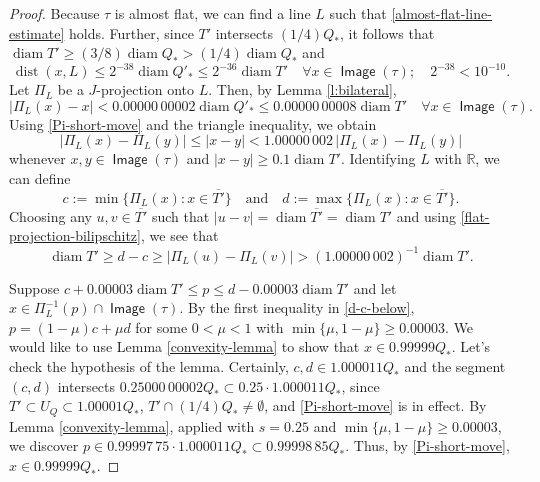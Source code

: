 \documentclass[12pt]{amsart}
\numberwithin{equation}{section}
\theoremstyle{plain}
\theoremstyle{definition}
\def\RR{\mathbb{R}}
\newcommand{\diam}{\mathop\mathrm{diam}\nolimits}
\newcommand{\dist}{\mathop\mathrm{dist}\nolimits}
\newcommand{\Image}{\mathop\mathsf{Image}\nolimits}
\numberwithin{figure}{section}
\begin{document}
\begin{proof} Because $\tau$ is almost flat, we can find a line $L$ such that \eqref{almost-flat-line-estimate} holds. Further, since $T'$ intersects $(1/4)Q_*$, it follows that $\diam T'\geq (3/8)\diam Q_*>(1/4)\diam Q_*$ and \begin{equation}
\label{central-almost-flat-line-estimate} \dist(x,L)\leq 2^{-38}\diam Q'_*\leq 2^{-36}\diam T'\quad\forall x\in \Image(\tau);\quad 2^{-38}< 10^{-10}.\end{equation} Let $\Pi_L$ be a $J$-projection onto $L$. Then, by Lemma \ref{l:bilateral}, \begin{equation}\label{Pi-short-move} |\Pi_L(x)-x|< 0.00000\,00002\diam Q'_*\leq 0.00000\,00008\diam T'\quad\forall x\in\Image(\tau).\end{equation} Using \eqref{Pi-short-move} and the triangle inequality, we obtain \begin{equation}\label{flat-projection-bilipschitz} |\Pi_L(x)-\Pi_L(y)|\leq |x-y|< 1.00000\,002\,|\Pi_L(x)-\Pi_L(y)|\end{equation} whenever $x,y\in \Image(\tau)$ and $|x-y|\geq 0.1\diam T'$. Identifying $L$ with $\RR$, we can define $$c:=\min\{\Pi_L(x):x\in \overline{T'}\}\quad\text{and}\quad d:=\max\{\Pi_L(x):x\in \overline{T'}\}.$$ Choosing any $u,v\in \overline{T'}$ such that $|u-v|=\diam\overline{T'}=\diam T'$ and using \eqref{flat-projection-bilipschitz}, we see that \begin{equation}\label{d-c-below} \diam T'\geq d-c\geq |\Pi_L(u)-\Pi_L(v)| > (1.00000\,002)^{-1}\diam T'.\end{equation}

Suppose $c+0.00003\diam T'\leq p\leq d-0.00003\diam T'$ and let $x\in \Pi_L^{-1}(p)\cap\Image(\tau)$. By the first inequality in \eqref{d-c-below}, $p=(1-\mu)c+\mu d$ for some $0<\mu<1$ with $\min\{\mu,1-\mu\}\geq 0.00003$. We would like to use Lemma \ref{convexity-lemma} to show that $x\in 0.99999Q_*$. Let's check the hypothesis of the lemma. Certainly, $c,d\in 1.000011Q_*$ and the segment $(c,d)$ intersects $0.25000\,00002 Q_*\subset 0.25\cdot 1.000011Q_*$, since $T'\subset U_Q\subset 1.00001Q_*$, $T'\cap (1/4)Q_*\neq\emptyset$, and \eqref{Pi-short-move} is in effect. By Lemma \ref{convexity-lemma}, applied with $s=0.25$ and $\min\{\mu,1-\mu\}\geq 0.00003$, we discover $p\in 0.99997\,75\cdot 1.000011Q_*\subset 0.99998\,85Q_*$. Thus, by \eqref{Pi-short-move}, $x\in 0.99999Q_*$.


\end{proof}
\end{document}

